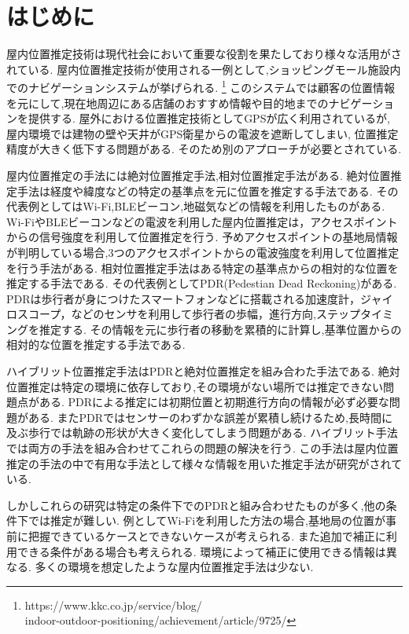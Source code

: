 
\section{はじめに}
屋内位置推定技術は現代社会において重要な役割を果たしており様々な活用がされている.
屋内位置推定技術が使用される一例として,ショッピングモール施設内でのナビゲーションシステムが挙げられる.
\footnote{https://www.kkc.co.jp/service/blog/\\indoor-outdoor-positioning/achievement/article/9725/}
このシステムでは顧客の位置情報を元にして,現在地周辺にある店舗のおすすめ情報や目的地までのナビゲーションを提供する.
屋外における位置推定技術としてGPSが広く利用されているが,
屋内環境では建物の壁や天井がGPS衛星からの電波を遮断してしまい,
位置推定精度が大きく低下する問題がある.
そのため別のアプローチが必要とされている.

屋内位置推定の手法には絶対位置推定手法,相対位置推定手法がある.
絶対位置推定手法は経度や緯度などの特定の基準点を元に位置を推定する手法である.
その代表例としてはWi-Fi,BLEビーコン,地磁気などの情報を利用したものがある.
Wi-FiやBLEビーコンなどの電波を利用した屋内位置推定は，アクセスポイントからの信号強度を利用して位置推定を行う.
予めアクセスポイントの基地局情報が判明している場合,3つのアクセスポイントからの電波強度を利用して位置推定を行う手法がある.
相対位置推定手法はある特定の基準点からの相対的な位置を推定する手法である.
その代表例としてPDR(Pedestian Dead Reckoning)がある.
PDRは歩行者が身につけたスマートフォンなどに搭載される加速度計，ジャイロスコープ，などのセンサを利用して歩行者の歩幅，進行方向,ステップタイミングを推定する.
その情報を元に歩行者の移動を累積的に計算し,基準位置からの相対的な位置を推定する手法である.

ハイブリット位置推定手法はPDRと絶対位置推定を組み合わた手法である.
絶対位置推定は特定の環境に依存しており,その環境がない場所では推定できない問題点がある.
PDRによる推定には初期位置と初期進行方向の情報が必ず必要な問題がある.
またPDRではセンサーのわずかな誤差が累積し続けるため,長時間に及ぶ歩行では軌跡の形状が大きく変化してしまう問題がある.
ハイブリット手法では両方の手法を組み合わせてこれらの問題の解決を行う.
この手法は屋内位置推定の手法の中で有用な手法として様々な情報を用いた推定手法が研究がされている.

しかしこれらの研究は特定の条件下でのPDRと組み合わせたものが多く,他の条件下では推定が難しい.
例としてWi-Fiを利用した方法の場合,基地局の位置が事前に把握できているケースとできないケースが考えられる.
また追加で補正に利用できる条件がある場合も考えられる.
環境によって補正に使用できる情報は異なる.
多くの環境を想定したような屋内位置推定手法は少ない.

